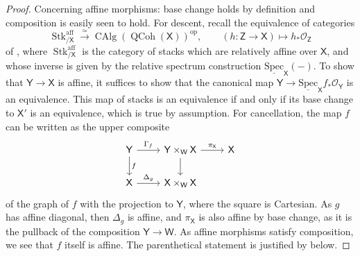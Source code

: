 \documentclass[11pt, a4paper]{article}
\newcommand{\aff}{\mathrm{aff}}
\newcommand{\relSpec}{{\underline{\mathrm{Spec}}}}
\newcommand{\1}{\mathbf{1}}
\DeclareMathOperator{\CAlg}{CAlg}
\DeclareMathOperator{\QCoh}{QCoh}
\DeclareMathOperator{\Stk}{Stk}
\newcommand{\op}{\mathrm{op}}
\renewcommand{\O}{\mathcal{O}}
\newcommand{\W}{\mathsf{W}}
\newcommand{\sfW}{\mathsf{W}}
\newcommand{\X}{\mathsf{X}}
\newcommand{\Y}{\mathsf{Y}}
\newcommand{\sfY}{\mathsf{Y}}
\newcommand{\sfZ}{\mathsf{Z}}
\newcommand{\Ga}{\Gamma}
\theoremstyle{plain}
\theoremstyle{definition}
\theoremstyle{remark}\numberwithin{equation}{section}
\begin{document}
\begin{proof}
    Concerning affine morphisms: base change holds by definition and composition is easily seen to hold. For descent, recall the equivalence of categories
    \[\Stk_{/\X}^\aff \xrightarrow{\simeq} \CAlg(\QCoh(\X))^\op, \qquad (h\colon \sfZ \to \X) \mapsto h_\ast \O_\sfZ\]
    of \cite[Thm.2.2.3.1]{reconstruction}, where $\Stk^\aff_{/\X}$ is the category of stacks which are relatively affine over $\X$, and whose inverse is given by the relative spectrum construction $\relSpec_\X(-)$. To show that $\Y \to \X$ is affine, it suffices to show that the canonical map $\Y \to \relSpec_\X f_\ast \O_\Y$ is an equivalence. This map of stacks is an equivalence if and only if its base change to $\X'$ is an equivalence, which is true by assumption. For cancellation, the map $f$ can be written as the upper composite
    \[\begin{tikzcd}
        {\Y}\ar[r, "{\Ga_f}"]\ar[d, "f"] &   {\Y \times_\sfW \X}\ar[d]\ar[r, "{\pi_\X}"]   &   {\X}  \\
        {\X}\ar[r, "{\Delta_g}"]    &   {\X \times_\sfW \X} &
    \end{tikzcd}\]
    of the graph of $f$ with the projection to $\sfY$, where the square is Cartesian. As $g$ has affine diagonal, then $\Delta_g$ is affine, and $\pi_\X$ is also affine by base change, as it is the pullback of the composition $\Y \to \W$. As affine morphisms satisfy composition, we see that $f$ itself is affine. The parenthetical statement is justified by  below.


\end{proof}
\end{document}
